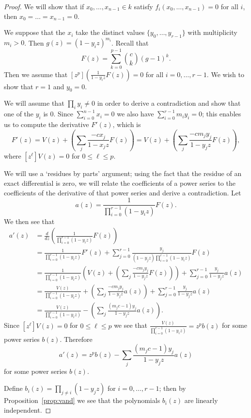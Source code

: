 \documentclass{amsart}
\numberwithin{equation}{section}
\theoremstyle{definition}
\begin{document}
\begin{proof} 

We will show that if $x_0,\dots,x_{n-1} \in k$ satisfy $f_i(x_0,\dots,x_{n-1})=0$ for all $i$, then $x_0=\dots=x_{n-1}=0$. 

We suppose that the $x_i$ take the distinct values $\{y_0,\dots,y_{r-1}\}$ with multiplicity $m_i>0$. Then $g(z)=(1-y_iz)^{m_i}$. Recall that
\[
F(z)=\sum_{k=0}^{p-1} \binom{c}{k}(g-1)^k.
\]
Then we assume that $[z^p]\left(\frac{1}{1-y_iz}F(z)\right)=0$ for all $i=0,\dots,r-1$. We wish to show that $r=1$ and $y_0=0$. 

We will assume that $\prod_i y_i \ne 0$ in order to derive a contradiction and show that one of the $y_i$ is $0$. Since $\sum_{i=0}^{n-1} x_i=0$ we also have $\sum_{i=0}^{r-1} m_iy_i=0$; this enables us to compute the derivative $F'(z)$, which is 
\[
F'(z)=V(z)+\left(\sum_j \frac{-cx_j}{1-x_jz}F(z)\right)=V(z)+\left(\sum_j \frac{-cm_jy_j}{1-y_jz}F(z)\right),
\]
where $[z^\ell]V(z)=0$ for $0 \le \ell \le p$. 

We will use a `residues by parts' argument; using the fact that the residue of an exact differential is zero, we will relate the coefficients of a power series to the coefficients of the derivative of that power series and derive a contradiction. 
Let
\[
a(z)=\frac{1}{\prod_{i=0}^{r-1}(1-y_iz)}F(z).
\]
We then see that
\begin{align*}
a'(z)&=\frac{d}{dz}\left(\frac{1}{\prod_{i=0}^{r-1}(1-y_iz)}F(z)\right)\\
&=\frac{1}{\prod_{i=0}^{r-1}(1-y_iz)}F'(z)+\sum_{j=0}^{r-1}\frac{y_j}{(1-y_jz)\prod_{i=0}^{r-1}(1-y_iz)}F(z)\\
&=\frac{1}{\prod_{i=0}^{r-1}(1-y_iz)}\left(V(z)+\left(\sum_j \frac{-cm_jy_j}{1-y_jz}F(z)\right)\right)+\sum_{j=0}^{r-1}\frac{y_j}{1-y_jz}a(z)\\
&=\frac{V(z)}{\prod_{i=0}^{r-1}(1-y_iz)}+\left(\sum_j \frac{-cm_jy_j}{1-y_jz}a(z)\right)+\sum_{j=0}^{r-1}\frac{y_j}{1-y_jz}a(z)\\
&=\frac{V(z)}{\prod_{i=0}^{r-1}(1-y_iz)}-\left(\sum_j \frac{(m_jc-1)y_j}{1-y_jz}a(z)\right).
\end{align*}
Since $[z^\ell]V(z)=0$ for $0 \le \ell \le p$ we see that $\frac{V(z)}{\prod_{i=0}^{r-1}(1-y_iz)}=z^pb(z)$ for some power series $b(z)$. Therefore
\[
a'(z)=z^pb(z)-\sum_j \frac{(m_jc-1)y_j}{1-y_jz}a(z)
\]
for some power series $b(z)$.

Define $b_i(z)=\prod_{j \ne i} (1-y_jz)$ for $i=0,\dots,r-1$; then by Proposition~\ref{prop:vand} we see that the polynomials $b_i(z)$ are linearly independent. 


\end{proof}
\end{document}
